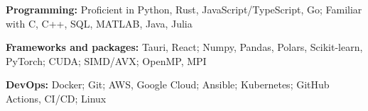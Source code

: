\begin{enumerate}[label={[\arabic*]},nosep]
  \item \textbf{Programming:} Proficient in Python, Rust, JavaScript/TypeScript, Go; Familiar with C, C++, SQL, MATLAB, Java, Julia
  \item \textbf{Frameworks and packages:} Tauri, React; Numpy, Pandas, Polars, Scikit-learn, PyTorch; CUDA; SIMD/AVX; OpenMP, MPI
  \item \textbf{DevOps:} Docker; Git; AWS, Google Cloud; Ansible; Kubernetes; GitHub Actions, CI/CD; Linux
\end{enumerate}
